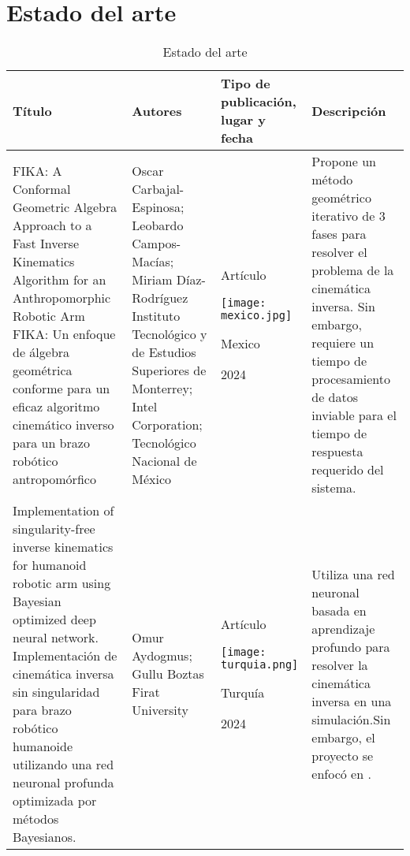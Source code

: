 \section{Estado del arte}

\begin{table}[h]
	\caption{Estado del arte}
	\begin{tabular}{p{5cm}p{4cm}p{3.6cm}p{4cm}}
		\textbf{Título} & \textbf{Autores} & \textbf{Tipo de publicación, lugar y fecha} & \textbf{Descripción} \\ 
		\midrule
		FIKA: A Conformal Geometric Algebra Approach to a Fast Inverse Kinematics Algorithm for an Anthropomorphic Robotic Arm \newline\newline
		FIKA: Un enfoque de álgebra geométrica conforme para un eficaz algoritmo cinemático inverso para un brazo robótico antropomórfico &  
		Oscar Carbajal-Espinosa; Leobardo Campos-Macías; Miriam Díaz-Rodríguez \newline\newline
		Instituto Tecnológico y de Estudios Superiores de Monterrey; Intel Corporation; Tecnológico Nacional de México & 
		\begin{center}Artículo \par \texttt{[image: mexico.jpg]} \par Mexico \par 2024\end{center} & 
		Propone un método geométrico iterativo de 3 fases para resolver el problema de la cinemática inversa.\newline\newline
		Sin embargo, requiere un tiempo de procesamiento de datos inviable para el tiempo de respuesta requerido del sistema.\\
		\midrule
		Implementation of singularity-free inverse kinematics for humanoid robotic arm using Bayesian optimized deep neural network. \newline\newline
		Implementación de cinemática inversa sin singularidad para brazo robótico humanoide utilizando una red neuronal profunda optimizada por métodos Bayesianos. &  
		Omur Aydogmus; Gullu Boztas \newline\newline 
		Firat University & 
		\begin{center}Artículo \par \texttt{[image: turquia.png]} \par Turquía \par 2024\end{center} & 
		Utiliza una red neuronal basada en aprendizaje profundo para resolver la cinemática inversa en una simulación.\newline\newline Sin embargo, el proyecto se enfocó en . \\
	\end{tabular}
\end{table}


